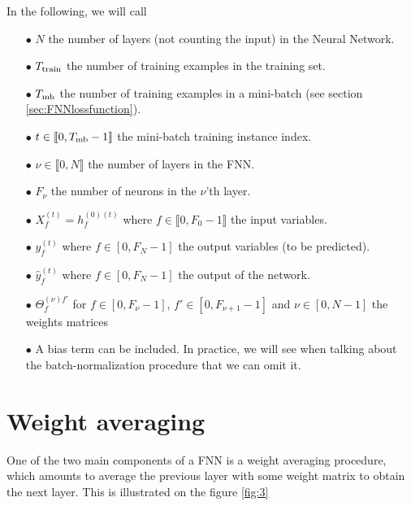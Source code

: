 In the following, we will call
\begin{itemize}
\item[$\bullet$] $N$ the number of layers (not counting the input) in the Neural Network.
\item[$\bullet$] $T_{{\rm train}}$ the number of training examples in the training set.
\item[$\bullet$] $T_{{\rm mb}}$ the number of training examples in a mini-batch (see section \ref{sec:FNNlossfunction}).
\item[$\bullet$] $t \in \llbracket0,T_{{\rm mb}}-1\rrbracket$ the mini-batch training instance index.
\item[$\bullet$] $\nu\in\llbracket0,N\rrbracket$ the number of layers in the FNN.
\item[$\bullet$] $F_\nu$ the number of neurons in the $\nu$'th layer.
\item[$\bullet$] $X^{(t)}_f=h_{f}^{(0)(t)}$ where $f\in\llbracket0,F_0-1\rrbracket$ the input variables.
\item[$\bullet$] $y^{(t)}_f$ where $f\in[0,F_N-1]$ the output variables (to be predicted).
\item[$\bullet$] $\hat{y}^{(t)}_f$ where $f\in[0,F_N-1]$ the output of the network.
\item[$\bullet$] $\Theta_{f}^{(\nu)f'}$ for $f\in [0,F_{\nu}-1]$, $f'\in [0,F_{\nu+1}-1]$ and $\nu\in[0,N-1]$ the weights matrices
\item[$\bullet$] A bias term can be included. In practice, we will see when talking about the batch-normalization procedure that we can omit it.
\end{itemize}


\section{Weight averaging}


One of the two main components of a FNN is a weight averaging procedure, which amounts to average the previous layer with some weight matrix to obtain the next layer. This is illustrated on the figure \ref{fig:3}


